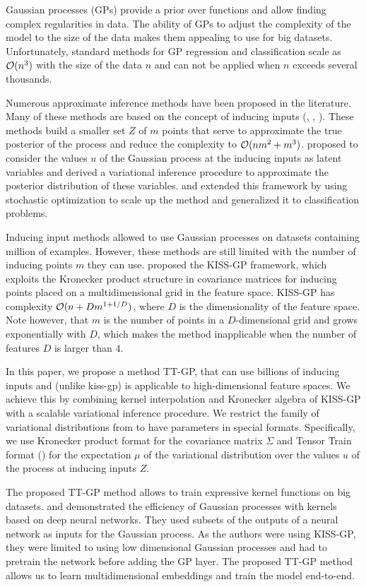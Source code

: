 Gaussian processes (GPs) provide a prior over functions and allow finding complex
regularities in data. The ability of GPs to adjust the complexity of the model
to the size of the data makes them appealing to use for big datasets.
Unfortunately, standard methods for GP regression and classification scale as
$\mathcal{O}(n^3)$ with the size of the data $n$ and can not be applied when $n$
exceeds several thousands.

Numerous approximate inference methods have been proposed in the literature. Many
of these methods are based on the concept of inducing inputs (\citet{candela2005},
\citet{snelson2006}, \citet{williams2000}). These methods build a smaller set
$Z$ of $m$ points that serve to approximate the true posterior of the process
and reduce the complexity to $\mathcal{O}(nm^2 + m^3)$. \citet{titsias2009} proposed
to consider the values $u$ of the Gaussian process at the inducing inputs
as latent variables and derived a variational inference procedure to approximate
the posterior distribution of these variables. \citet{hensman2013} and
\citet{hensman2015} extended this framework by using stochastic optimization to
scale up the method and generalized it to classification problems.

Inducing input methods allowed to use Gaussian processes on datasets containing
million of examples. However, these methods are still limited with the number
of inducing points $m$ they can use. \citet{wilson2015} proposed the KISS-GP
framework, which exploits the Kronecker product structure in covariance matrices
for inducing points placed on a multidimensional grid in the feature space.
KISS-GP has complexity $\mathcal{O}(n + D m^{1 + 1/D})$, where $D$ is the dimensionality
of the feature space. Note however, that $m$ is the number of points in a
$D$-dimensional grid and grows exponentially with $D$, which makes the method
inapplicable when the number of features $D$ is larger than $4$.

In this paper, we propose a method TT-GP, that can use billions of inducing
inputs and (unlike kiss-gp) is applicable to high-dimensional feature spaces.
We achieve this by combining kernel interpolation and Kronecker algebra of KISS-GP with
a scalable variational inference procedure. We restrict the family of
variational distributions from \citet{hensman2013} to have parameters in
special formats. Specifically, we use Kronecker product format for the
covariance matrix $\Sigma$ and Tensor Train format (\citet{oseledets2011}) for the
expectation $\mu$ of the variational distribution over the values $u$ of the
process at inducing inputs $Z$.

The proposed TT-GP method allows to train expressive kernel functions
on big datasets. \citet{wilson2016deep} and \citet{wilson2016stochastic}
demonstrated the efficiency of Gaussian processes with kernels based on deep
neural networks. They used subsets of the outputs of a neural network as
inputs for the Gaussian process. As the authors were using KISS-GP, they
were limited to using low dimensional Gaussian processes and had to
pretrain the network before adding the GP layer. The proposed TT-GP method
allows us to learn multidimensional embeddings and train the model end-to-end.

